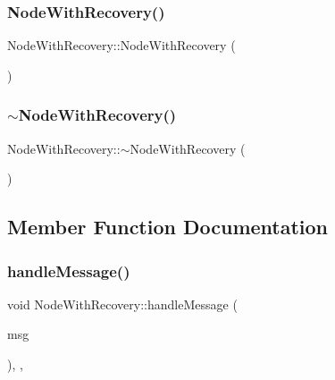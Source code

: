 \subsubsection{\texorpdfstring{Node\+With\+Recovery()}{NodeWithRecovery()}}
{\footnotesize\ttfamily Node\+With\+Recovery\+::\+Node\+With\+Recovery (\begin{DoxyParamCaption}{ }\end{DoxyParamCaption})}

\mbox{\label{classNodeWithRecovery_a5cb1367a800cf960b96c9011ab94a616}} 
\subsubsection{\texorpdfstring{$\sim$\+Node\+With\+Recovery()}{~NodeWithRecovery()}}
{\footnotesize\ttfamily Node\+With\+Recovery\+::$\sim$\+Node\+With\+Recovery (\begin{DoxyParamCaption}{ }\end{DoxyParamCaption})\hspace{0.3cm}{\ttfamily [virtual]}}



\subsection{Member Function Documentation}
\mbox{\label{classNodeWithRecovery_a901c89606b84898e13fe8a66228acd9f}} 
\subsubsection{\texorpdfstring{handle\+Message()}{handleMessage()}}
{\footnotesize\ttfamily void Node\+With\+Recovery\+::handle\+Message (\begin{DoxyParamCaption}\item[{c\+Message $\ast$}]{msg }\end{DoxyParamCaption})\hspace{0.3cm}{\ttfamily [override]}, {\ttfamily [protected]}, {\ttfamily [virtual]}}



